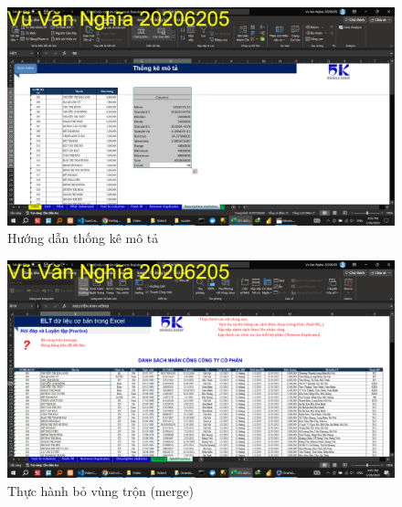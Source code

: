 \documentclass{article}
\begin{document}
\begin{figure}[h]
\centering
\includegraphics[scale = 0.15]{Video1/HuongDan/13.png}
\caption{Hướng dẫn thống kê mô tả}
\end{figure}

\begin{figure}[h]
\centering
\includegraphics[scale = 0.15]{Video1/ThucHanh/1.png}
\caption{Thực hành bỏ vùng trộn (merge)}
\end{figure}
\end{document}
